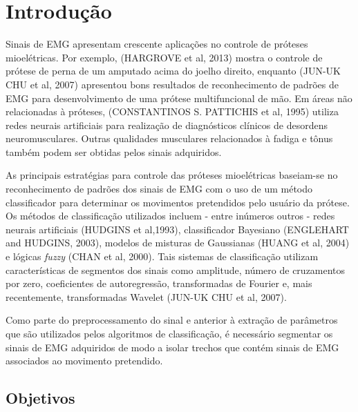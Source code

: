 \documentclass[
	12pt,				%
	openright,			%
	oneside,
	a4paper,			%
	english,			%
	francais,				%
	spanish,			%
	brazil				%
	]{abntex2}
\begin{document}
\textual

\chapter{Introdução}

	Sinais de EMG apresentam crescente aplicações no controle de próteses mioelétricas. Por exemplo, (HARGROVE et al, 2013) mostra o controle de prótese de perna de um amputado acima do joelho direito, enquanto (JUN-UK CHU et al, 2007) apresentou bons resultados de reconhecimento de padrões de EMG para desenvolvimento de uma prótese multifuncional de mão. Em áreas não relacionadas à próteses, (CONSTANTINOS S. PATTICHIS et al, 1995) utiliza redes neurais artificiais para realização de diagnósticos clínicos de desordens neuromusculares. Outras qualidades musculares relacionados à fadiga e tônus também podem ser obtidas pelos sinais adquiridos.

	As principais estratégias para controle das próteses mioelétricas baseiam-se no reconhecimento de padrões dos sinais de EMG com o uso de um método classificador para determinar os movimentos pretendidos pelo usuário da prótese. Os métodos de classificação utilizados incluem - entre inúmeros outros - redes neurais artificiais (HUDGINS et al,1993), classificador Bayesiano (ENGLEHART and HUDGINS, 2003), modelos de misturas de Gaussianas (HUANG et al, 2004) e lógicas \emph{fuzzy} (CHAN et al, 2000). Tais sistemas de classificação utilizam características de segmentos dos sinais como amplitude, número de cruzamentos por zero, coeficientes de autoregressão, transformadas de Fourier e, mais recentemente, transformadas Wavelet (JUN-UK CHU et al, 2007).

	Como parte do preprocessamento do sinal e anterior à extração de parâmetros que são utilizados pelos algoritmos de classificação, é necessário segmentar os sinais de EMG adquiridos de modo a isolar trechos que contém sinais de EMG associados ao movimento pretendido.

\section{Objetivos}
\end{document}
